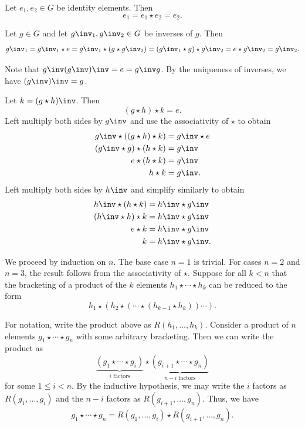 \begin{proofnum}
    \item Let $e_1, e_2 \in G$ be identity elements. Then
    \[
        e_1 = e_1 \star e_2 = e_2.
    \]
    \item Let $g \in G$ and let $g\inv_1, g\inv_2 \in G$ be inverses of $g$. Then
    \[
        g\inv_1 = g\inv_1 \star e = g\inv_1 \star (g \star g\inv_2) = (g\inv_1 \star g) \star g\inv_2 = e \star g\inv_2 = g\inv_2.
    \]
    \item Note that $g\inv(g\inv)\inv = e = g\inv g$. By the uniqueness of inverses, we have $(g\inv)\inv = g$.
    \item Let $k = (g \star h)\inv$. Then
    \[
        (g \star h) \star k = e.
    \]
    Left multiply both sides by $g\inv$ and use the associativity of $\star$ to obtain
    \begin{align*}
        g\inv \star ((g \star h) \star k) &= g\inv \star e \\
        (g\inv \star g) \star (h \star k) &= g\inv \\
        e \star (h \star k) &= g\inv \\
        h \star k &= g\inv.
    \end{align*}
    Left multiply both sides by $h\inv$ and simplify similarly to obtain
    \begin{align*}
        h\inv \star (h \star k) &= h\inv \star g\inv \\
        (h\inv \star h) \star k &= h\inv \star g\inv \\
        e \star k &= h\inv \star g\inv \\
        k &= h\inv \star g\inv.
    \end{align*}
    \item We proceed by induction on $n$.
    The base case $n = 1$ is trivial.
    For cases $n = 2$ and $n = 3$, the result follows from the associativity of $\star$.
    Suppose for all $k < n$ that the bracketing of a product of the $k$ elements $h_1 \star \cdots \star h_k$ can be reduced to the form
    \[
        h_1 \star (h_2 \star (\cdots \star (h_{k-1} \star h_k)) \cdots).
    \]
    
    For notation, write the product above as $R(h_1, \ldots, h_k)$.
    Consider a product of $n$ elements $g_1 \star \cdots \star g_n$ with some arbitrary bracketing.
    Then we can write the product as
    \[
        \underbrace{(g_1 \star \cdots \star g_i)}_{i \text{ factors}} \star \underbrace{(g_{i + 1} \star \cdots \star g_n)}_{n-i \text{ factors}}
    \]
    for some $1 \leq i < n$.
    By the inductive hypothesis, we may write the $i$ factors as $R(g_1, \ldots, g_i)$ and the $n-i$ factors as $R(g_{i + 1}, \ldots, g_n)$.
    Thus, we have
    \[
        g_1 \star \cdots \star g_n = R(g_1, \ldots, g_i) \star R(g_{i + 1}, \ldots, g_n).
    \]


\end{proofnum}

